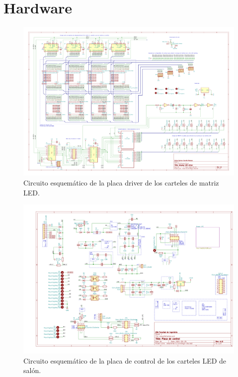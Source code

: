 \section{Hardware}

\begin{figure}[ht]
	\centering
	\includegraphics[width=1\textwidth]{./Figures/output.driverLED.pdf}
	\caption{Circuito esquemático de la placa driver de los carteles de matriz LED.}
	\label{fig:schDriverLED}
\end{figure}

\begin{figure}[ht]
	\centering
	\includegraphics[width=1\textwidth]{./Figures/output.placaControl.pdf}
	\caption{Circuito esquemático de la placa de control de los carteles LED de salón.}
	\label{fig:schController}
\end{figure}

